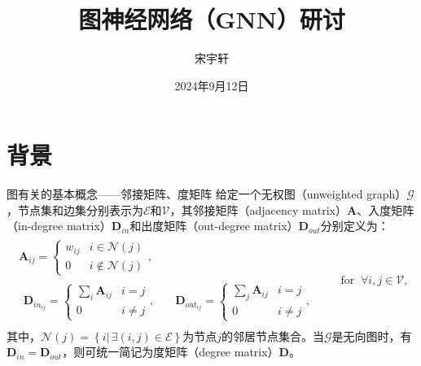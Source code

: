 \documentclass{beamer}
\title{图神经网络（GNN）研讨}
\author{宋宇轩}
\date{2024年9月12日}
\begin{document}
\maketitle




\section{背景}



\begin{frame}{图有关的基本概念——邻接矩阵、度矩阵}
	给定一个无权图（unweighted graph）$\mathscr{G}$，节点集和边集分别表示为$\mathscr{E}$和$\mathscr{V}$，其邻接矩阵（adjacency matrix）$\textbf{A}$、入度矩阵（in-degree matrix）$\textbf{D}_{in}$和出度矩阵（out-degree matrix）$\textbf{D}_{out}$分别定义为：
	\begin{equation}
		\begin{matrix}
			\begin{matrix}
				\textbf{A}_{ij}=\left\{
				\begin{matrix}
					w_{ij} & i\in\mathcal{N}\left(j\right) \\
					0 & i\notin\mathcal{N}\left(j\right)
				\end{matrix}\right.,
				\\
				\begin{matrix}
					\textbf{D}_{in_{ij}}=\left\{
					\begin{matrix}
						\sum\limits_i\textbf{A}_{ij} & i=j
						\\
						0 & i\neq j
					\end{matrix}\right.,
					&
					\quad\textbf{D}_{out_{ij}}=\left\{
					\begin{matrix}
						\sum\limits_j\textbf{A}_{ij} & i=j
						\\
						0 & i\neq j
					\end{matrix}\right.,
				\end{matrix}
			\end{matrix}&
			\quad\text{for}\;\;\forall i,j\in\mathscr{V},
		\end{matrix}
	\end{equation}
	其中，$\mathcal{N}\left(j\right)=\left\{i|\,\exists\left(i,j\right)\in\mathscr{E}\right\}$为节点$j$的邻居节点集合。当$\mathscr{G}$是无向图时，有$\textbf{D}_{in}=\textbf{D}_{out}$，则可统一简记为度矩阵（degree matrix）$\textbf{D}$。
\end{frame}
\end{document}
